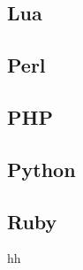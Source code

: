 \documentclass{KodeBook}
\begin{document}

\subsection{Lua}


\subsection{Perl}


\subsection{PHP}


\subsection{Python}


\subsection{Ruby}

hh




\ifx\wholebook\relax\else
% 
% 
	
\end{document}
